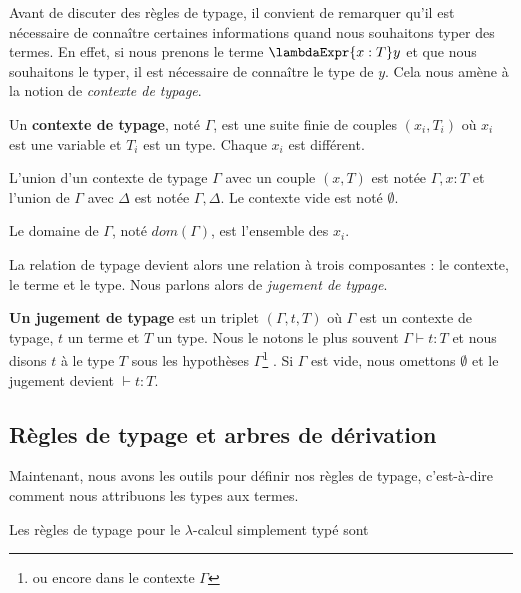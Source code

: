 Avant de discuter des règles de typage, il convient de remarquer qu'il est
nécessaire de connaître certaines informations quand nous souhaitons typer des
termes. En effet, si nous prenons le terme $\lambdaExpr{x : T} y$ et que nous
souhaitons le typer, il est nécessaire de connaître le type de $y$. Cela nous
amène à la notion de \textit{contexte de typage}.

\begin{definition} 
  \label{def:simply-typed-lambda-calculus-context}
  Un \textbf{contexte de typage}, noté $\Gamma$, est une suite finie de couples $(x_{i},
  T_{i})$ où $x_{i}$ est une variable et $T_{i}$ est un type. Chaque $x_{i}$ est différent.

  L'union d'un contexte de typage $\Gamma$ avec un couple $(x, T)$ est notée
  $\Gamma, x : T$ et l'union de $\Gamma$ avec $\Delta$ est notée $\Gamma, \Delta$.
  Le contexte vide est noté $\emptyset$.

  Le domaine de $\Gamma$, noté $dom(\Gamma)$, est l'ensemble des $x_{i}$.
\end{definition}

La relation de typage devient alors une relation à trois composantes : le
contexte, le terme et le type. Nous parlons alors de \textit{jugement de typage}.

\begin{definition} 
  \label{def:simply-typed-lambda-calculus-judgement}
  \textbf{Un jugement de typage} est un triplet $(\Gamma, t, T)$ où $\Gamma$ est un
  contexte de typage, $t$ un terme et $T$ un type. Nous le notons le plus
  souvent $\Gamma \vdash t : T$ et nous disons \og $t$ à le type $T$ sous les
  hypothèses $\Gamma$\footnote{ou encore dans le contexte $\Gamma$} \fg.
  Si $\Gamma$
  est vide, nous omettons $\emptyset$ et le jugement devient $\vdash t : T$.
\end{definition}

\subsection*{Règles de typage et arbres de dérivation}

Maintenant, nous avons les outils pour définir nos règles de typage,
c'est-à-dire comment nous attribuons les types aux termes.

\begin{definition} 
  \label{def:simply-typed-lambda-calculus-typing-rules}
  Les règles de typage pour le $\lambda$-calcul simplement typé sont
\end{definition}

